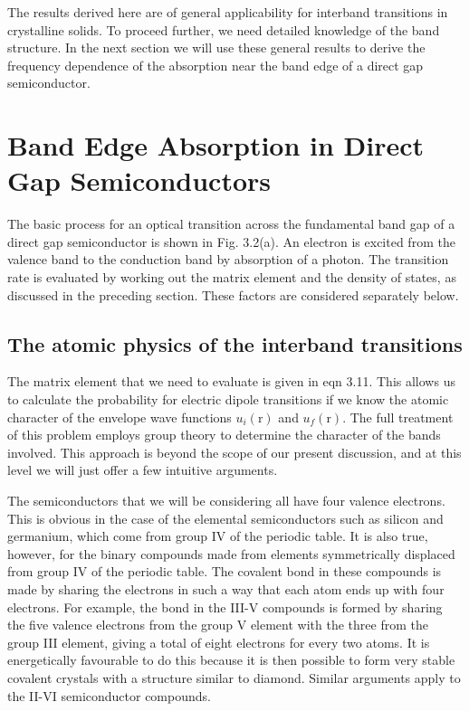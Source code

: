 \documentclass[12pt]{book}
\begin{document}
The results derived here are of general applicability for interband transitions in crystalline solids. To proceed further, we need detailed knowledge of the band structure. In the next section we will use these general results to derive the frequency dependence of the absorption near the band edge of a direct gap semiconductor.

\section{Band Edge Absorption in Direct Gap Semiconductors}
The basic process for an optical transition across the fundamental band gap of a direct gap semiconductor is shown in Fig. 3.2(a). An electron is excited from the valence band to the conduction band by absorption of a photon. The transition rate is evaluated by working out the matrix element and the density of states, as discussed in the preceding section. These factors are considered separately below.

\subsection{The atomic physics of the interband transitions}
The matrix element that we need to evaluate is given in eqn 3.11. This allows us to calculate the probability for electric dipole transitions if we know the atomic character of the envelope wave functions $u_i(\mathrm{r})$ and $u_f(\mathrm{r})$. The full treatment of this problem employs group theory to determine the character of the bands involved. This approach is beyond the scope of our present discussion, and at this level we will just offer a few intuitive arguments.

The semiconductors that we will be considering all have four valence electrons. This is obvious in the case of the elemental semiconductors such as silicon and germanium, which come from group IV of the periodic table. It is also true, however, for the binary compounds made from elements symmetrically displaced from group IV of the periodic table. The covalent bond in these compounds is made by sharing the electrons in such a way that each atom ends up with four electrons. For example, the bond in the III-V compounds is formed by sharing the five valence electrons from the group V element with the three from the group III element, giving a total of eight electrons for every two atoms. It is energetically favourable to do this because it is then possible to form very stable covalent crystals with a structure similar to diamond. Similar arguments apply to the II-VI semiconductor compounds.
\end{document}
